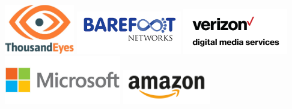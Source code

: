 \documentclass[12pt]{article}
\begin{document}
\begin{center}
\includegraphics[width=1.2in]{thousand-eyes.jpg}
\hspace{0.2in}
\includegraphics[width=1.8in]{barefoot-networks.jpg}
\hspace{0.2in}
\includegraphics[width=1.8in]{verizon.png}
\hspace{0.2in}
\includegraphics[width=2in]{microsoft.jpg}
\hspace{0.2in}
\includegraphics[width=1.5in]{amazon.png}
\\[-0.1cm]


\end{center}
\end{document}
